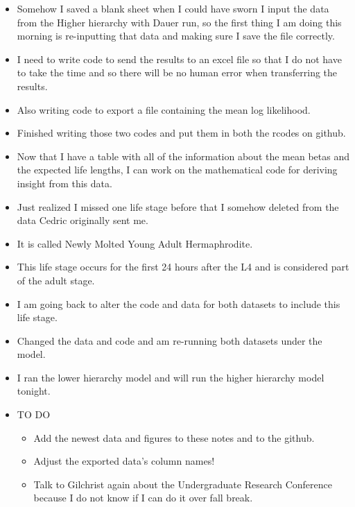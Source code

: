 \documentclass[letterpaper,index=totoc,hyperref,openany]{labbook} %
\begin{document}
\begin{itemize}
\item Somehow I saved a blank sheet when I could have sworn I input the data from the Higher hierarchy with Dauer run, so the first thing I am doing this morning is re-inputting that data and making sure I save the file correctly.
\item I need to write code to send the results to an excel file so that I do not have to take the time and so there will be no human error when transferring the results.
\item Also writing code to export a file containing the mean log likelihood.
\item Finished writing those two codes and put them in both the rcodes on github.
\item Now that I have a table with all of the information about the mean betas and the expected life lengths, I can work on the mathematical code for deriving insight from this data.
\item Just realized I missed one life stage before that I somehow deleted from the data Cedric originally sent me.
\item It is called Newly Molted Young Adult Hermaphrodite.
\item This life stage occurs for the first 24 hours after the L4 and is considered part of the adult stage.
\item I am going back to alter the code and data for both datasets to include this life stage.
\item Changed the data and code and am re-running both datasets under the model.
\item I ran the lower hierarchy model and will run the higher hierarchy model tonight.
\item TO DO
\begin{itemize}
\item Add the newest data and figures to these notes and to the github.
\item Adjust the exported data's column names!
\item Talk to Gilchrist again about the Undergraduate Research Conference because I do not know if I can do it over fall break.
\end{itemize}
\end{itemize}
\end{document}
